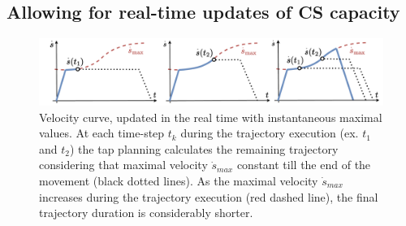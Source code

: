 
\subsection{Allowing for real-time updates of CS capacity}
\label{ch:update_cap}




\begin{figure}[t]
    \centering
    \includegraphics[width=\linewidth]{Papers/imgs/tap_replanning3.pdf}
    \caption{Velocity curve, updated in the real time with instantaneous maximal values. At each time-step $t_k$ during the trajectory execution (ex. $t_1$ and $t_2$) the \gls{tap} planning calculates the remaining trajectory considering that maximal velocity $\dot{s}_{max}$ constant till the end of the movement (black dotted lines). As the maximal velocity $\dot{s}_{max}$ increases during the trajectory execution (red dashed line), the final trajectory duration is considerably shorter. }
    \label{fig:replanning}
\end{figure}

